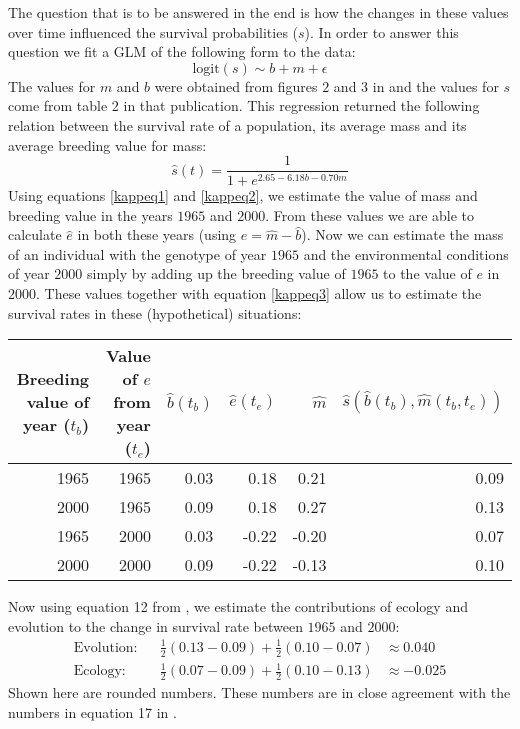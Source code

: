 The question that is to be answered in the end is how the changes in these values over time influenced the survival probabilities ($s$). In order to answer this question we fit a GLM of the following form to the data:
\begin{equation}
\text{logit}(s) \sim b + m + \epsilon
\label{kappeq3}
\end{equation}
The values for $m$ and $b$ were obtained from figures $2$ and $3$ in \citet{Garant2004} and the values for $s$ come from table $2$ in that publication. This regression returned the following relation between the survival rate of a population, its average mass and its average breeding value for mass:
\begin{equation}
\hat{s}(t) = \frac{1}{1+e^{2.65-6.18b-0.70m}}
\end{equation}
Using equations \ref{kappeq1} and \ref{kappeq2}, we estimate the value of mass and breeding value in the years $1965$ and $2000$. From these values we are able to calculate $\hat{e}$ in both these years (using $\hat{e}=\hat{m}-\hat{b}$). Now we can estimate the mass of an individual with the genotype of year $1965$ and the environmental conditions of year $2000$ simply by adding up the breeding value of $1965$ to the value of $e$ in $2000$. These values together with equation \ref{kappeq3} allow us to estimate the survival rates in these (hypothetical) situations:
\begin{table}[ht]
\centering
\begin{tabular}{rrrrrr}
  \hline
Breeding value of year ($t_b$) & Value of $e$ from year ($t_e$)& $\hat{b}(t_b)$ & $\hat{e}(t_e)$ & $\hat{m}$ & $\hat{s}(\hat{b}(t_b),\hat{m}(t_b,t_e))$\\ 
  \hline
1965 & 1965 & 0.03 & 0.18 & 0.21 & 0.09 \\ 
  2000 & 1965 & 0.09 & 0.18 & 0.27 & 0.13 \\ 
  1965 & 2000 & 0.03 & -0.22 & -0.20 & 0.07 \\ 
  2000 & 2000 & 0.09 & -0.22 & -0.13 & 0.10 \\ 
   \hline
\end{tabular}
\end{table}
Now using equation 12 from \citet{Ellner2011}, we estimate the contributions of ecology and evolution to the change in survival rate between $1965$ and $2000$:
\begin{align}
\text{Evolution:} & & \frac{1}{2} (0.13-0.09) + \frac{1}{2} (0.10-0.07) &\approx 0.040 \label{evopathav}\\
\text{Ecology:} & & \frac{1}{2} (0.07-0.09) + \frac{1}{2} (0.10-0.13) &\approx -0.025 \label{ecopathav}
\end{align}
Shown here are rounded numbers. These numbers are in close agreement with the numbers in equation 17 in \citet{Ellner2011}.
